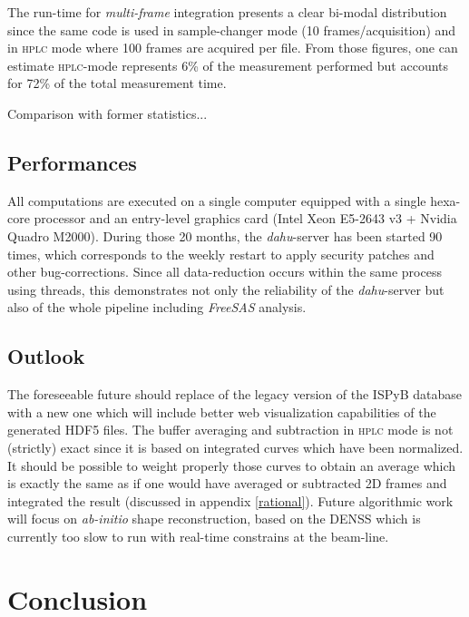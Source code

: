 \documentclass[preprint]{iucr}              %
\begin{document}
The run-time for \textit{multi-frame} integration presents a clear bi-modal distribution since the same code is used in sample-changer mode (10 frames/acquisition) and in \textsc{hplc} mode where 100 frames are acquired per file.
From those figures, one can estimate \textsc{hplc}-mode represents 6\% of the measurement performed but accounts for 72\% of the total measurement time.

Comparison with former statistics...

\subsection{Performances}

All computations are executed on a single computer equipped with a single hexa-core processor and an entry-level graphics card (Intel Xeon E5-2643 v3 + Nvidia Quadro M2000). 
During those 20 months, the \textit{dahu}-server has been started 90 times, which corresponds to the weekly restart to apply security patches and other bug-corrections. 
Since all data-reduction occurs within the same process using threads, this demonstrates not only the reliability of the \textit{dahu}-server 
but also of the whole pipeline including \textit{FreeSAS} analysis.
\subsection{Outlook}

The foreseeable future should replace of the legacy version of the ISPyB database with a new one which will include better web visualization capabilities of the generated HDF5 files.
The buffer averaging and subtraction in \textsc{hplc} mode is not (strictly) exact since it is based on integrated curves which have been normalized.
It should be possible to weight properly those curves to obtain an average which is exactly the same as if one would have averaged or subtracted 2D frames and integrated the result (discussed in appendix \ref{rational}).
Future algorithmic work will focus on \textit{ab-initio} shape reconstruction, based on the DENSS \cite{denss} which is currently too slow to run with real-time constrains at the beam-line.

\section{Conclusion}
\end{document}
